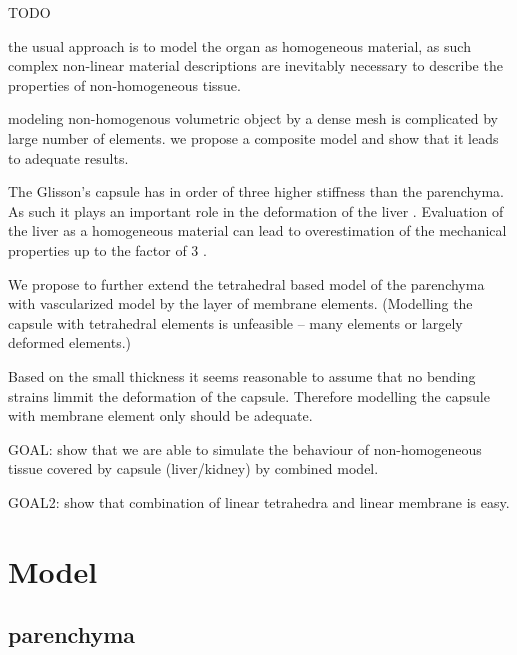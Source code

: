 \documentclass{llncs}
\begin{document}
TODO



the usual approach is to model the organ as homogeneous material,
as such complex non-linear material descriptions are inevitably necessary
to describe the properties of non-homogeneous tissue.

modeling non-homogenous volumetric object by a dense mesh is complicated by
large number of elements. we propose a composite model and show that it
leads to adequate results.


The Glisson's capsule has in order of three higher
stiffness than the parenchyma. As such it plays an important role in the
deformation of the liver \cite{Ahn2010,Hollenstein2006}. Evaluation of the
liver as a homogeneous material can lead to overestimation of the
mechanical properties up to the factor of 3 \cite{Hollenstein2006}.


We propose to further extend the tetrahedral based model of the parenchyma
with vascularized model \cite{Peterlik2012} by the layer of membrane elements.
(Modelling the capsule with tetrahedral elements is unfeasible -- many
elements or largely deformed elements.)

Based on the small thickness it seems reasonable to assume that no bending
strains limmit the deformation of the capsule. Therefore modelling the
capsule with membrane element only should be adequate.

GOAL: show that we are able to simulate the behaviour of non-homogeneous
tissue covered by capsule (liver/kidney) by combined model.

GOAL2: show that combination of linear tetrahedra and linear membrane is
easy.



\section{Model}

\subsection{parenchyma} %
\end{document}
